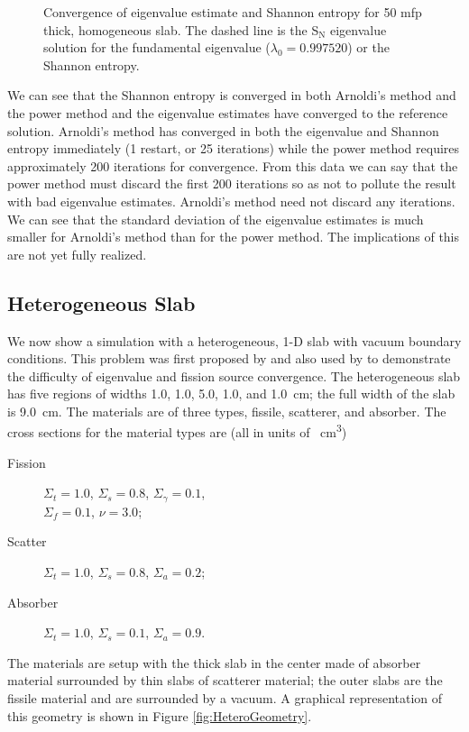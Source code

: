 \documentclass[12]{ansnse}
\begin{document}
\begin{doublespace}
\begin{figure}[h]
    \caption{Convergence of eigenvalue estimate and Shannon entropy for 50 mfp thick, homogeneous slab.  The dashed line is the S$_{\mathrm{N}}$ eigenvalue solution for the fundamental eigenvalue ($\lambda_0 = 0.997520$) or the Shannon entropy.}
    \label{fig:Homogeneous}
\end{figure}

We can see that the Shannon entropy is converged in both Arnoldi's method and the power method and the eigenvalue estimates have converged to the reference solution.  Arnoldi's method has converged in both the eigenvalue and Shannon entropy immediately (1 restart, or 25 iterations) while the power method requires approximately 200 iterations for convergence.  From this data we can say that the power method must discard the first 200 iterations so as not to pollute the result with bad eigenvalue estimates.  Arnoldi's method need not discard any iterations.  We can see that the standard deviation of the eigenvalue estimates is much smaller for Arnoldi's method than for the power method.  The implications of this are not yet fully realized.  

\subsection{Heterogeneous Slab}
We now show a simulation with a heterogeneous, 1-D slab with vacuum boundary conditions.  This problem was first proposed by \citet{Kornreich:2002Semi--0} and also used by \citet{Ueki:2005Stati-0} to demonstrate the difficulty of eigenvalue and fission source convergence.  The heterogeneous slab has five regions of widths \num{1.0}, \num{1.0}, \num{5.0}, \num{1.0}, and \SI{1.0}{cm}; the full width of the slab is \SI{9.0}{cm}.  The materials are of three types, fissile, scatterer, and absorber.  The cross sections for the material types are (all in units of \si{\per\cubic\centi\meter})
\begin{description}
    \item[Fission] $\Sigma_t = 1.0$, $\Sigma_s = 0.8$, $\Sigma_{\gamma} = 0.1$, \\$\Sigma_f = 0.1$, $\nu = 3.0$;
    \item[Scatter] $\Sigma_t = 1.0$, $\Sigma_s = 0.8$, $\Sigma_a = 0.2$;
    \item[Absorber] $\Sigma_t = 1.0$, $\Sigma_s = 0.1$, $\Sigma_a = 0.9$.
\end{description}
The materials are setup with the thick slab in the center made of absorber material surrounded by thin slabs of scatterer material; the outer slabs are the fissile material and are surrounded by a vacuum.  A graphical representation of this geometry is shown in Figure \ref{fig:HeteroGeometry}.


\end{doublespace}
\end{document}

